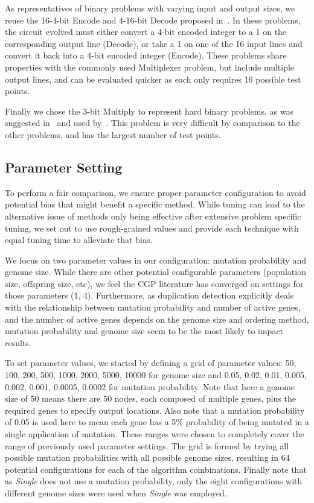 \documentclass[journal]{IEEEtran}
\begin{document}
As representatives of binary problems with varying input and output sizes, we
reuse the 16-4-bit Encode and 4-16-bit Decode proposed in~\cite{goldman:2013:cgpwaste}.
In these problems, the circuit evolved must either convert a 4-bit encoded integer
to a 1 on the corresponding output line (Decode), or take a 1 on one of the 16
input lines and convert it back into a 4-bit encoded integer (Encode).  These
problems share properties with the commonly used Multiplexer problem, but include
multiple output lines, and can be evaluated quicker as each only requires 16 possible
test points.

Finally we chose the 3-bit Multiply to represent hard binary problems,
as was suggested in~\cite{white:2013:bgpb} and used
by~\cite{vassilev:2000:neutrality,miller:2006:redundancy,walker:2008:cgpmodules}.
This problem is very difficult by comparison to the other problems, and has
the largest number of test points.

\subsection{Parameter Setting}
\label{sec:parameter}
To perform a fair comparison, we ensure proper parameter configuration
to avoid potential bias that might benefit
a specific method.  While tuning can lead to the alternative issue
of methods only being effective after extensive problem specific tuning, we set out to use
rough-grained values and provide each technique with equal tuning time to alleviate that bias.

We focus on two parameter values in our configuration: mutation probability and genome size.
While there are other potential configurable parameters (population size, offspring size, etc),
we feel the CGP literature has converged on settings for those parameters (1, 4).
Furthermore, as duplication detection explicitly deals with the relationship between
mutation probability and number of active genes, and the number of active genes depends
on the genome size and ordering method, mutation probability and genome size seem to be
the most likely to impact results.

To set parameter values, we started by defining a grid of parameter values:
50, 100, 200, 500, 1000, 2000, 5000, 10000 for genome size and 0.05, 0.02, 0.01,
0.005, 0.002, 0.001, 0.0005, 0.0002 for mutation probability.  Note that here a genome
size of 50 means there are 50 nodes, each composed of multiple genes, plus the
required genes to specify output locations.  Also note that a mutation probability of 0.05
is used here to mean each gene has a 5\% probability of being mutated in a single
application of mutation.  These ranges were chosen to completely cover the
range of previously used parameter settings.
The grid is formed by trying all possible mutation probabilities
with all possible genome sizes, resulting in 64 potential configurations for each
of the algorithm combinations.  Finally note that as \emph{Single} does not
use a mutation probability, only the eight configurations with different genome sizes were
used when \emph{Single} was employed.
\end{document}
